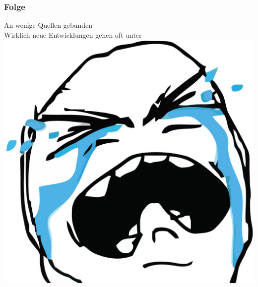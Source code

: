 \documentclass{beamer}
\begin{document}
\begin{frame}
  \frametitle{Folge} \pause
  \begin{center}
    An wenige Quellen gebunden \pause\\
    Wirklich neue Entwicklungen gehen oft unter \pause\\
  \includegraphics[height=.5\textheight]{sadcrying}  
  \end{center}
\end{frame}
   
\end{document}
